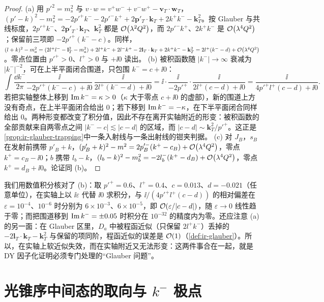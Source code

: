 \begin{proof}
(a) 用 $p'^2=m_s^2$ 与 $v\cdot w=v^+w^-+v^-w^+-\mathbf v_T\cdot\mathbf w_T$，
$(p'-k)^2-m_s^2=-2p'^+k^--2p'^-k^++2\mathbf p'_T\cdot\mathbf k_T+2k^+k^--\mathbf k_T^2$。按 Glauber 与共线标度，$2p'^+k^-$、$2\mathbf p'_T\cdot\mathbf k_T$、$\mathbf k_T^2$ 都是 $\mathcal{O}\!\left(\lambda^2Q^2\right)$，而 $2p'^-k^+$、$2k^+k^-$ 是 $\mathcal{O}\!\left(\lambda^4Q^2\right)$；保留前三项即 $-2p'^+(k^--c)$。同样，$(l+k)^2-m_a^2=(2l^+l^--\mathbf l_T^2-m_a^2)+2l^+k^-+2l^-k^+-2\mathbf l_T\cdot\mathbf k_T+2k^+k^--\mathbf k_T^2=2l^+(k^--d)+\mathcal{O}\!\left(\lambda^4Q^2\right)$。零点位置由 $p'^+>0$、$l^+>0$ 与 $+\ii0$ 读出。
(b) 被积函数随 $|k^-|\to\infty$ 衰减为 $|k^-|^{-2}$，可在上半平面闭合围道，只包围 $k^-=c+\ii0$：
\[
\int\frac{\dd k^-}{2\pi}\frac{\ii}{-2p'^+(k^--c)+\ii0}\,\frac{\ii}{2l^+(k^--d)+\ii0}
=\ii\cdot\frac{\ii}{-2p'^+}\cdot\frac{\ii}{2l^+(c-d)+\ii0}=\frac{\ii}{4p'^+l^+(c-d)+\ii0}.
\]
若把实轴整体上移到 $\operatorname{Im} k^-=\kappa>0$（$\kappa$ 大于零点 $c+\ii0$ 的虚部），新的围道上方没有奇点，在上半平面闭合给出 $0$；若下移到 $\operatorname{Im} k^-=-\kappa$，在下半平面闭合同样给出 $0$。两种形变都改变了积分值，因此不存在离开实轴附近的形变：被积函数的全部贡献来自两零点之间 $|k^--c|\lesssim|c-d|$ 的区域，而 $|c-d|\sim\mathbf k_T^2/p'^+$。这正是\cref{prop:ir-glauber-trapping}中一条入射线与一条出射线的钳夹判据。
(c) 对 $J_B$，$s_B$ 在发射前携带 $p'_B+k$，$(p'_B+k)^2-m^2=2p'^-_B(k^+-c_B)+\mathcal{O}\!\left(\lambda^4Q^2\right)$，零点 $k^+=c_B-\ii0$；$b$ 携带 $l_b-k$，$(l_b-k)^2-m_b^2=-2l_b^-(k^+-d_B)+\mathcal{O}\!\left(\lambda^4Q^2\right)$，零点 $k^+=d_B+\ii0$。论证同 (b)。
\end{proof}

我们用数值积分核对了 (b)：取 $p'^+=0.6$、$l^+=0.4$、$c=0.013$、$d=-0.021$（任意单位），在实轴上以 $\ii\varepsilon$ 代替 $\ii0$ 求积分，与 $\ii/(4p'^+l^+(c-d))$ 的相对偏差在 $\varepsilon=10^{-4}$、$10^{-6}$ 时分别为 $6\times10^{-3}$、$6\times10^{-5}$，即 $\mathcal{O}\!\left(\varepsilon/|c-d|\right)$，随 $\varepsilon\to0$ 线性趋于零；而把围道移到 $\operatorname{Im} k^-=\pm0.05$ 时积分在 $10^{-32}$ 的精度内为零。还应注意 (a) 的另一面：在 Glauber 区里，$D_a$ 中被程函近似（只保留 $2l^+k^-$）丢掉的 $-2\mathbf l_T\cdot\mathbf k_T-\mathbf k_T^2$ 与保留的项同阶，程函近似的误差是 $\mathcal{O}\!\left(1\right)$（\cref{def:ir-glauber}）。所以，在实轴上软近似失效，而在实轴附近又无法形变：这两件事合在一起，就是 DY 因子化证明必须专门处理的“Glauber 问题”。

\section{光锥序中间态的取向与 \texorpdfstring{$k^-$}{k-} 极点}\label{sec:dy-orientation}

